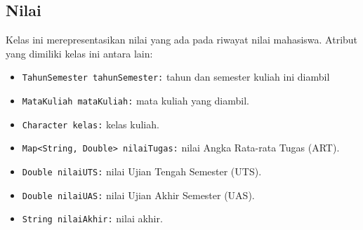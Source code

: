 \subsection{Nilai}
Kelas ini merepresentasikan nilai yang ada pada riwayat nilai mahasiswa. Atribut yang dimiliki kelas ini antara lain:
\begin{itemize}
	\item \texttt{TahunSemester tahunSemester:} tahun dan semester kuliah ini diambil
	\item \texttt{MataKuliah mataKuliah:} mata kuliah yang diambil.
	\item \texttt{Character kelas:} kelas kuliah.
	\item \texttt{Map<String, Double> nilaiTugas:} nilai Angka Rata-rata Tugas (ART).
	\item \texttt{Double nilaiUTS:} nilai Ujian Tengah Semester (UTS).
	\item \texttt{Double nilaiUAS:} nilai Ujian Akhir Semester (UAS).
	\item \texttt{String nilaiAkhir:} nilai akhir.
\end{itemize}

